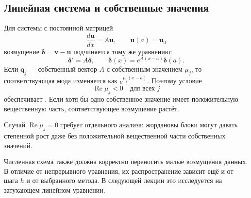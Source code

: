 \documentclass[../final.tex]{subfiles}
\begin{document}
\subsection{Линейная система и собственные значения}

Для системы с постоянной матрицей
\begin{equation*}
    \frac{d\boldsymbol u}{dx}=A\boldsymbol u,\qquad
    \boldsymbol u(a)=\boldsymbol u_0
\end{equation*}
возмущение $\boldsymbol\delta=\boldsymbol v-\boldsymbol u$
подчиняется тому же уравнению:
\begin{equation*}
    \boldsymbol\delta'=A\boldsymbol\delta,\qquad
    \boldsymbol\delta(x)=e^{A(x-a)}\boldsymbol\delta(a).
\end{equation*}
Если $\boldsymbol q_j$ --- собственный вектор $A$ с собственным
значением $\mu_j$, то соответствующая мода изменяется как
$e^{\mu_j(x-a)}$. Поэтому условие
\begin{equation*}
    \operatorname{Re}\mu_j<0\quad\text{для всех }j
\end{equation*}
обеспечивает .
Если хотя бы одно собственное значение имеет положительную
вещественную часть, соответствующее возмущение растёт.

\remark
Случай $\operatorname{Re}\mu_j=0$ требует отдельного анализа:
жордановы блоки могут давать степенной рост даже без положительной
вещественной части собственных значений.

Численная схема также должна корректно переносить малые возмущения
данных. В отличие от непрерывного уравнения, их распространение
зависит ещё и от шага $h$ и от выбранного метода. В следующей лекции
это исследуется на затухающем линейном уравнении.
\end{document}
